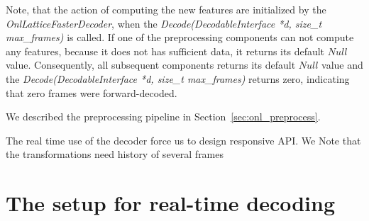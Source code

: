 Note, that the action of computing the new features are initialized by the {\it OnlLatticeFasterDecoder},
when the {\it Decode(DecodableInterface *d, size\_t max\_frames)}\/ is called.
If one of the preprocessing components can not compute any features, 
because it does not has sufficient data, it returns its default $Null$ value. 
Consequently, all subsequent components returns its default $Null$ value and 
the {\it Decode(DecodableInterface *d, size\_t max\_frames)}\/ returns zero,
indicating that zero frames were forward-decoded.

We described the preprocessing pipeline in Section~\ref{sec:onl_preprocess}.

The real time use of the decoder force us to design responsive \acl{API}.
We  
Note that the transformations need history of several frames



\section{The setup for real-time decoding}








